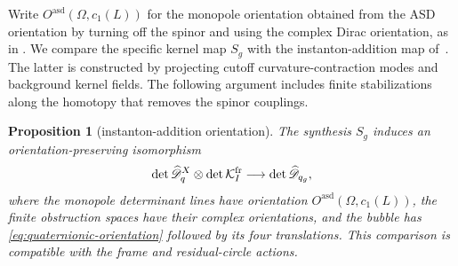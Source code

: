 \documentclass[11pt]{amsart}
\newtheorem{proposition}[theorem]{Proposition}
\theoremstyle{definition}
\theoremstyle{remark}
\theoremstyle{plain}
\newcommand{\cK}{\mathcal{K}}
\begin{document}
Write $O^{\mathrm{asd}}(\Omega,c_1(L))$ for the monopole orientation
obtained from the ASD orientation by turning off the spinor and using
the complex Dirac orientation, as in
\cite[Lemma~2.2 and Definition~2.3]{FeehanLenessII}.
We compare the specific kernel map $S_g$ with the instanton-addition
map of~\cite[Proposition~(3.20)]{DonaldsonOrientation}.  The latter is
constructed by projecting cutoff curvature-contraction modes and
background kernel fields.  The following argument includes finite
stabilizations along the homotopy that removes the spinor couplings.

\begin{proposition}[instanton-addition orientation]
\label{prop:addition-orientation}
The synthesis $S_g$ induces an orientation-preserving isomorphism
\begin{equation}\label{eq:augmented-excision}
 \det\widehat{\mathscr D}^{X}_q\otimes\det\cK_I^{\rm fr}
 \longrightarrow\det\widehat{\mathscr D}_{q_g},
\end{equation}
where the monopole determinant lines have orientation
$O^{\mathrm{asd}}(\Omega,c_1(L))$, the finite obstruction spaces have
their complex orientations, and the bubble has
\eqref{eq:quaternionic-orientation} followed by its four translations.
This comparison is compatible with the frame and residual-circle actions.
\end{proposition}
\end{document}
